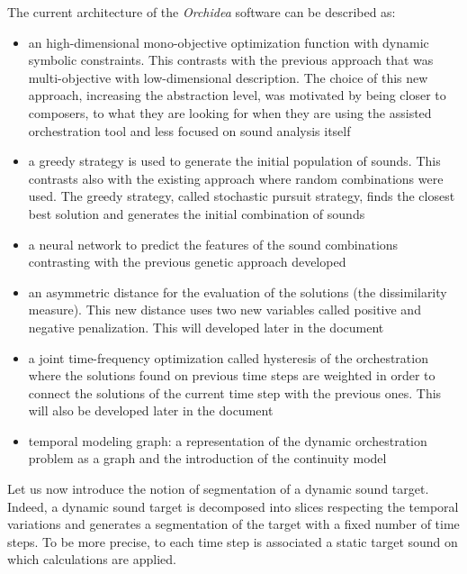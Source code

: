\documentclass[a4paper]{book}
\begin{document}
The current architecture of the \textit{Orchidea} software can be described as:
\begin{itemize}
    \item an high-dimensional mono-objective optimization function with dynamic symbolic constraints. This contrasts with the previous approach that was multi-objective with  low-dimensional description. The choice of this new approach, increasing the abstraction level, was motivated by being closer to composers, to what they are looking for when they are using the assisted orchestration tool and less focused on sound analysis itself
    \item a greedy strategy is used to generate the initial population of sounds. This contrasts also with the existing approach where random combinations were used. The greedy strategy, called stochastic pursuit strategy, finds the closest best solution and generates the initial combination of sounds 
    \item a neural network to predict the features of the sound combinations contrasting with the previous genetic approach developed
    \item an asymmetric distance for the evaluation of the solutions (the dissimilarity measure). This new distance uses two new variables called positive and negative penalization. This will developed later in the document 
    \item a joint time-frequency optimization called hysteresis of the orchestration where the solutions found on previous time steps are weighted in order to connect the solutions of the current time step with the previous ones. This will also be developed later in the document
    \item temporal modeling graph: a representation of the dynamic orchestration problem as a graph and the introduction of the continuity model
\end{itemize}

Let us now introduce the notion of segmentation of a dynamic sound target. Indeed, a dynamic sound target is decomposed into slices respecting the temporal variations and generates a segmentation of the target with a fixed number of time steps. To be more precise, to each time step is associated a static target sound on which calculations are applied.
\end{document}
